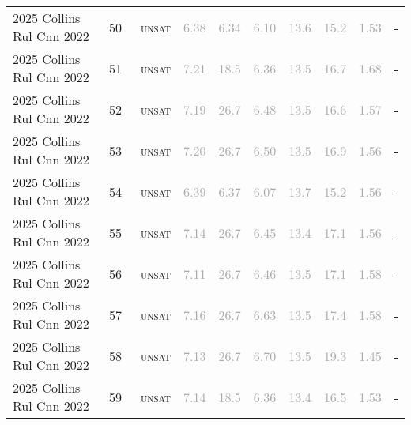 \begin{center}
{\begin{longtable}{@{}llllllllll@{}}
2025 Collins Rul Cnn 2022 & 50 & ~\textsc{unsat} & \textcolor{darkgray}{6.38} & \textcolor{darkgray}{6.34} & \textcolor{darkgray}{6.10} & \textcolor{darkgray}{13.6} & \textcolor{darkgray}{15.2} & \textcolor{darkgray}{1.53} & - \\
2025 Collins Rul Cnn 2022 & 51 & ~\textsc{unsat} & \textcolor{darkgray}{7.21} & \textcolor{darkgray}{18.5} & \textcolor{darkgray}{6.36} & \textcolor{darkgray}{13.5} & \textcolor{darkgray}{16.7} & \textcolor{darkgray}{1.68} & - \\
2025 Collins Rul Cnn 2022 & 52 & ~\textsc{unsat} & \textcolor{darkgray}{7.19} & \textcolor{darkgray}{26.7} & \textcolor{darkgray}{6.48} & \textcolor{darkgray}{13.5} & \textcolor{darkgray}{16.6} & \textcolor{darkgray}{1.57} & - \\
2025 Collins Rul Cnn 2022 & 53 & ~\textsc{unsat} & \textcolor{darkgray}{7.20} & \textcolor{darkgray}{26.7} & \textcolor{darkgray}{6.50} & \textcolor{darkgray}{13.5} & \textcolor{darkgray}{16.9} & \textcolor{darkgray}{1.56} & - \\
2025 Collins Rul Cnn 2022 & 54 & ~\textsc{unsat} & \textcolor{darkgray}{6.39} & \textcolor{darkgray}{6.37} & \textcolor{darkgray}{6.07} & \textcolor{darkgray}{13.7} & \textcolor{darkgray}{15.2} & \textcolor{darkgray}{1.56} & - \\
2025 Collins Rul Cnn 2022 & 55 & ~\textsc{unsat} & \textcolor{darkgray}{7.14} & \textcolor{darkgray}{26.7} & \textcolor{darkgray}{6.45} & \textcolor{darkgray}{13.4} & \textcolor{darkgray}{17.1} & \textcolor{darkgray}{1.56} & - \\
2025 Collins Rul Cnn 2022 & 56 & ~\textsc{unsat} & \textcolor{darkgray}{7.11} & \textcolor{darkgray}{26.7} & \textcolor{darkgray}{6.46} & \textcolor{darkgray}{13.5} & \textcolor{darkgray}{17.1} & \textcolor{darkgray}{1.58} & - \\
2025 Collins Rul Cnn 2022 & 57 & ~\textsc{unsat} & \textcolor{darkgray}{7.16} & \textcolor{darkgray}{26.7} & \textcolor{darkgray}{6.63} & \textcolor{darkgray}{13.5} & \textcolor{darkgray}{17.4} & \textcolor{darkgray}{1.58} & - \\
2025 Collins Rul Cnn 2022 & 58 & ~\textsc{unsat} & \textcolor{darkgray}{7.13} & \textcolor{darkgray}{26.7} & \textcolor{darkgray}{6.70} & \textcolor{darkgray}{13.5} & \textcolor{darkgray}{19.3} & \textcolor{darkgray}{1.45} & - \\
2025 Collins Rul Cnn 2022 & 59 & ~\textsc{unsat} & \textcolor{darkgray}{7.14} & \textcolor{darkgray}{18.5} & \textcolor{darkgray}{6.36} & \textcolor{darkgray}{13.4} & \textcolor{darkgray}{16.5} & \textcolor{darkgray}{1.53} & - \\

\end{longtable}}
\end{center}
